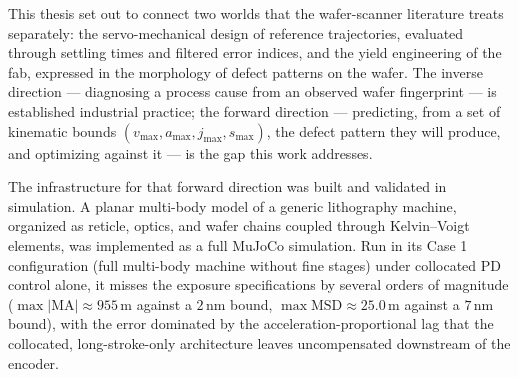 \def\baselinestretch{1}
\label{ch:conclusion}
\def\baselinestretch{1.1}

This thesis set out to connect two worlds that the wafer-scanner literature treats separately: the servo-mechanical design of reference trajectories, evaluated through settling times and filtered error indices, and the yield engineering of the fab, expressed in the morphology of defect patterns on the wafer. The inverse direction --- diagnosing a process cause from an observed wafer fingerprint --- is established industrial practice; the forward direction --- predicting, from a set of kinematic bounds $(v_{\max}, a_{\max}, j_{\max}, s_{\max})$, the defect pattern they will produce, and optimizing against it --- is the gap this work addresses.

The infrastructure for that forward direction was built and validated in simulation. A planar multi-body model of a generic lithography machine, organized as reticle, optics, and wafer chains coupled through Kelvin--Voigt elements, was implemented as a full MuJoCo simulation. Run in its Case 1 configuration (full multi-body machine without fine stages) under collocated PD control alone, it misses the exposure specifications by several orders of magnitude ($\max|\mathrm{MA}| \approx 955$\,\textmu m against a $2$\,nm bound, $\max\mathrm{MSD} \approx 25.0$\,\textmu m against a $7$\,nm bound), with the error dominated by the acceleration-proportional lag that the collocated, long-stroke-only architecture leaves uncompensated downstream of the encoder.

